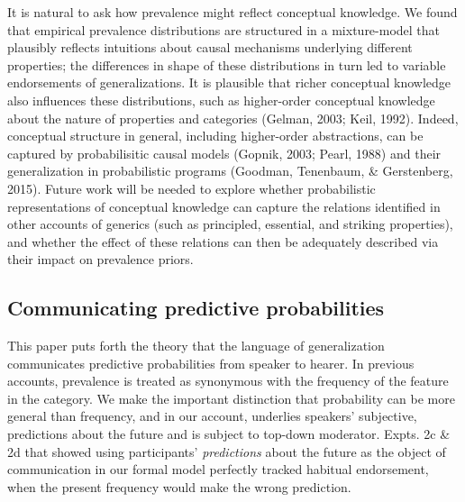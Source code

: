 \documentclass[english,floatsintext,man]{apa6}
\theoremstyle{definition}
\theoremstyle{definition}
\theoremstyle{definition}
\theoremstyle{remark}
\begin{document}
It is natural to ask how prevalence might reflect conceptual knowledge.
We found that empirical prevalence distributions are structured in a
mixture-model that plausibly reflects intuitions about causal mechanisms
underlying different properties; the differences in shape of these
distributions in turn led to variable endorsements of generalizations.
It is plausible that richer conceptual knowledge also influences these
distributions, such as higher-order conceptual knowledge about the
nature of properties and categories (Gelman, 2003; Keil, 1992). Indeed,
conceptual structure in general, including higher-order abstractions,
can be captured by probabilisitic causal models (Gopnik, 2003; Pearl,
1988) and their generalization in probabilistic programs (Goodman,
Tenenbaum, \& Gerstenberg, 2015). Future work will be needed to explore
whether probabilistic representations of conceptual knowledge can
capture the relations identified in other accounts of generics (such as
principled, essential, and striking properties), and whether the effect
of these relations can then be adequately described via their impact on
prevalence priors.

\subsection{Communicating predictive
probabilities}\label{communicating-predictive-probabilities}

This paper puts forth the theory that the language of generalization
communicates predictive probabilities from speaker to hearer. In
previous accounts, prevalence is treated as synonymous with the
frequency of the feature in the category. We make the important
distinction that probability can be more general than frequency, and in
our account, underlies speakers' subjective, predictions about the
future and is subject to top-down moderator. Expts. 2c \& 2d that showed
using participants' \emph{predictions} about the future as the object of
communication in our formal model perfectly tracked habitual
endorsement, when the present frequency would make the wrong prediction.
\end{document}
